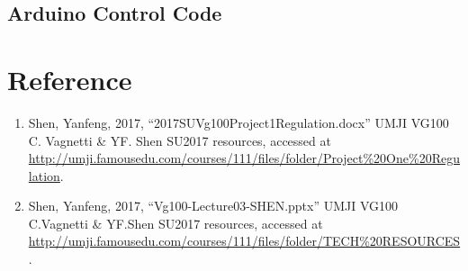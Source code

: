 \subsection{Arduino Control Code}
\singlespacing



\newpage
\normalsize
\section{Reference}
\begin{enumerate}
\item Shen, Yanfeng, 2017, “2017SUVg100Project1Regulation.docx” UMJI VG100 C. Vagnetti \& YF. Shen SU2017 resources, accessed at \url{http://umji.famousedu.com/courses/111/files/folder/Project%20One%20Regulation}.
\item Shen, Yanfeng, 2017, “Vg100-Lecture03-SHEN.pptx” UMJI VG100 C.Vagnetti \& YF.Shen SU2017 resources, accessed at \url{http://umji.famousedu.com/courses/111/files/folder/TECH%20RESOURCES}.
\end{enumerate}